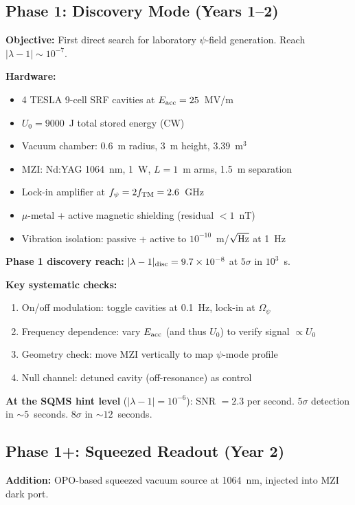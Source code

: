 \documentclass[11pt]{article}
\newcommand{\ee}[1]{\times 10^{#1}}
\newcommand{\Opsi}{\Omega_\psi}
\newcommand{\lam}{\lambda}
\begin{document}
\subsection{Phase 1: Discovery Mode (Years 1--2)}

\textbf{Objective:} First direct search for laboratory $\psi$-field
generation. Reach $|\lam-1| \sim 10^{-7}$.

\textbf{Hardware:}
\begin{itemize}[nosep]
\item 4 TESLA 9-cell SRF cavities at $E_{\rm acc} = 25$~MV/m
\item $U_0 = 9000$~J total stored energy (CW)
\item Vacuum chamber: 0.6~m radius, 3~m height, 3.39~m$^3$
\item MZI: Nd:YAG 1064~nm, 1~W, $L = 1$~m arms, 1.5~m separation
\item Lock-in amplifier at $f_\psi = 2f_{\rm TM} = 2.6$~GHz
\item $\mu$-metal + active magnetic shielding (residual $< 1$~nT)
\item Vibration isolation: passive + active to $10^{-10}$~m/$\sqrt{\rm Hz}$ at 1~Hz
\end{itemize}

\textbf{Phase 1 discovery reach:}
$|\lam-1|_{\rm disc} = 9.7\ee{-8}$ at $5\sigma$ in $10^3$~s.

\textbf{Key systematic checks:}
\begin{enumerate}
\item On/off modulation: toggle cavities at 0.1~Hz, lock-in at $\Opsi$
\item Frequency dependence: vary $E_{\rm acc}$ (and thus $U_0$)
to verify signal $\propto U_0$
\item Geometry check: move MZI vertically to map $\psi$-mode profile
\item Null channel: detuned cavity (off-resonance) as control
\end{enumerate}

\textbf{At the SQMS hint level} ($|\lam-1| = 10^{-6}$):
SNR $= 2.3$ per second. $5\sigma$ detection in $\sim 5$~seconds.
$8\sigma$ in $\sim 12$~seconds.

\subsection{Phase 1+: Squeezed Readout (Year 2)}

\textbf{Addition:} OPO-based squeezed vacuum source at 1064~nm,
injected into MZI dark port.
\end{document}
